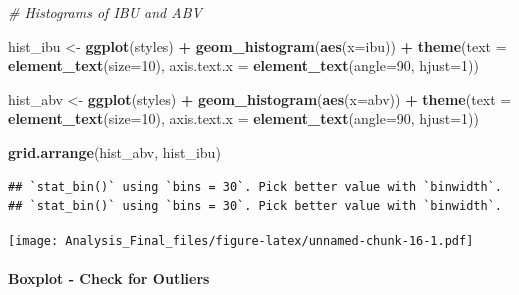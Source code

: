 \documentclass[]{article}
\newenvironment{Shaded}{\begin{snugshade}}{\end{snugshade}}
\newcommand{\KeywordTok}[1]{\textcolor[rgb]{0.13,0.29,0.53}{\textbf{#1}}}
\newcommand{\DataTypeTok}[1]{\textcolor[rgb]{0.13,0.29,0.53}{#1}}
\newcommand{\DecValTok}[1]{\textcolor[rgb]{0.00,0.00,0.81}{#1}}
\newcommand{\StringTok}[1]{\textcolor[rgb]{0.31,0.60,0.02}{#1}}
\newcommand{\CommentTok}[1]{\textcolor[rgb]{0.56,0.35,0.01}{\textit{#1}}}
\newcommand{\OperatorTok}[1]{\textcolor[rgb]{0.81,0.36,0.00}{\textbf{#1}}}
\newcommand{\NormalTok}[1]{#1}
\let\oldparagraph\paragraph
\renewcommand{\paragraph}[1]{\oldparagraph{#1}\mbox{}}
\begin{document}
\begin{Shaded}
\begin{Highlighting}[]
\CommentTok{# Histograms of IBU and ABV}

\NormalTok{hist_ibu <-}\StringTok{ }\KeywordTok{ggplot}\NormalTok{(styles) }\OperatorTok{+}
\StringTok{              }\KeywordTok{geom_histogram}\NormalTok{(}\KeywordTok{aes}\NormalTok{(}\DataTypeTok{x=}\NormalTok{ibu)) }\OperatorTok{+}
\StringTok{              }\KeywordTok{theme}\NormalTok{(}\DataTypeTok{text =} \KeywordTok{element_text}\NormalTok{(}\DataTypeTok{size=}\DecValTok{10}\NormalTok{),}
                  \DataTypeTok{axis.text.x =} \KeywordTok{element_text}\NormalTok{(}\DataTypeTok{angle=}\DecValTok{90}\NormalTok{, }\DataTypeTok{hjust=}\DecValTok{1}\NormalTok{)) }

\NormalTok{hist_abv <-}\StringTok{ }\KeywordTok{ggplot}\NormalTok{(styles) }\OperatorTok{+}
\StringTok{              }\KeywordTok{geom_histogram}\NormalTok{(}\KeywordTok{aes}\NormalTok{(}\DataTypeTok{x=}\NormalTok{abv)) }\OperatorTok{+}
\StringTok{              }\KeywordTok{theme}\NormalTok{(}\DataTypeTok{text =} \KeywordTok{element_text}\NormalTok{(}\DataTypeTok{size=}\DecValTok{10}\NormalTok{),}
                  \DataTypeTok{axis.text.x =} \KeywordTok{element_text}\NormalTok{(}\DataTypeTok{angle=}\DecValTok{90}\NormalTok{, }\DataTypeTok{hjust=}\DecValTok{1}\NormalTok{)) }


\KeywordTok{grid.arrange}\NormalTok{(hist_abv, hist_ibu)}
\end{Highlighting}
\end{Shaded}

\begin{verbatim}
## `stat_bin()` using `bins = 30`. Pick better value with `binwidth`.
## `stat_bin()` using `bins = 30`. Pick better value with `binwidth`.
\end{verbatim}

\texttt{[image: Analysis\_Final\_files/figure-latex/unnamed-chunk-16-1.pdf]}

\paragraph{Boxplot - Check for
Outliers}\label{boxplot---check-for-outliers}
\end{document}
